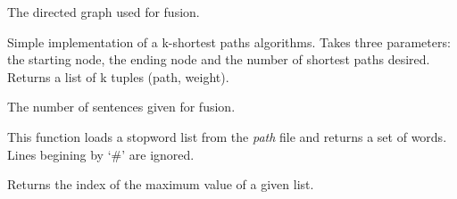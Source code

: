\documentclass[letterpaper,10pt,english]{sphinxmanual}
\begin{document}
\begin{fulllineitems}
\begin{fulllineitems}
\end{fulllineitems}


\begin{fulllineitems}
\label{index:takahe.word_graph.graph}
The directed graph used for fusion.

\end{fulllineitems}


\begin{fulllineitems}
\label{index:takahe.word_graph.k_shortest_paths}
Simple implementation of a k-shortest paths algorithms. Takes three
parameters: the starting node, the ending node and the number of 
shortest paths desired. Returns a list of k tuples (path, weight).

\end{fulllineitems}


\begin{fulllineitems}
\label{index:takahe.word_graph.length}
The number of sentences given for fusion.

\end{fulllineitems}


\begin{fulllineitems}
\label{index:takahe.word_graph.load_stopwords}
This function loads a stopword list from the \emph{path} file and returns a 
set of words. Lines begining by `\#' are ignored.

\end{fulllineitems}


\begin{fulllineitems}
\label{index:takahe.word_graph.max_index}
Returns the index of the maximum value of a given list.

\end{fulllineitems}


\end{fulllineitems}
\end{document}
